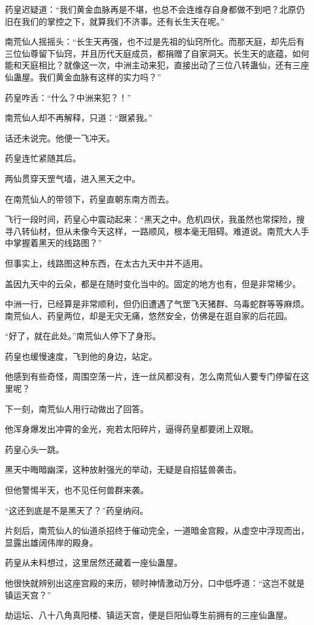 \begin{this_body}
药皇迟疑道：“我们黄金血脉再是不堪，也总不会连维存自身都做不到吧？北原仍旧在我们的掌控之下，就算我们不济事。还有长生天在呢。”

南荒仙人摇摇头：“长生天再强，也不过是先祖的仙窍所化。而那天庭，却先后有三位仙尊留下仙窍，并且历代天庭成员，都捐赠了自家洞天。长生天的底蕴，如何能和天庭相比？就像这一次，中洲主动来犯，直接出动了三位八转蛊仙，还有三座仙蛊屋。我们黄金血脉有这样的实力吗？”

药皇咋舌：“什么？中洲来犯？！”

南荒仙人却不再解释，只道：“跟紧我。”

话还未说完。他便一飞冲天。

药皇连忙紧随其后。

两仙贯穿天罡气墙，进入黑天之中。

在南荒仙人的带领下，药皇直朝东南方而去。

飞行一段时间，药皇心中震动起来：“黑天之中。危机四伏，我虽然也常探险，搜寻八转仙材，但从未像今天这样，一路顺风，根本毫无阻碍。难道说。南荒大人手中掌握着黑天的线路图？”

但事实上，线路图这种东西，在太古九天中并不适用。

盖因九天中的云朵，都是在随时变化当中的。固定的地方也有，但是非常稀少。

中洲一行，已经算是非常顺利，但仍旧遭遇了气罡飞天猪群、乌毒蛇群等等麻烦。南荒仙人、药皇两位，却是无灾无痛，悠然安全，仿佛是在逛自家的后花园。

“好了，就在此处。”南荒仙人停下了身形。

药皇也缓慢速度，飞到他的身边，站定。

他感到有些奇怪，周围空荡一片，连一丝风都没有，怎么南荒仙人要专门停留在这里呢？

下一刻，南荒仙人用行动做出了回答。

他浑身爆发出冲霄的金光，宛若太阳碎片，逼得药皇都要闭上双眼。

药皇心头一跳。

黑天中晦暗幽深，这种放射强光的举动，无疑是自招猛兽袭击。

但他警惕半天，也不见任何兽群来袭。

“这还到底是不是黑天了？”药皇纳闷。

片刻后，南荒仙人的仙道杀招终于催动完全，一道暗金宫殿，从虚空中浮现而出，显露出雄阔伟岸的殿身。

药皇从未料想过，这里居然还藏着一座仙蛊屋。

他很快就辨别出这座宫殿的来历，顿时神情激动万分，口中低呼道：“这岂不就是镇运天宫？”

劫运坛、八十八角真阳楼、镇运天宫，便是巨阳仙尊生前拥有的三座仙蛊屋。


\end{this_body}
